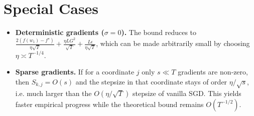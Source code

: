 \documentclass{article}
\begin{document}
\section*{Special Cases}
\begin{itemize}
    \item \textbf{Deterministic gradients ($\sigma=0$).} The bound reduces to
    $\displaystyle \frac{2(f(w_{1})-f^{\star})}{\eta\sqrt{T}}+\frac{\eta L G^{2}}{\sqrt{T}}+\frac{L\epsilon}{\eta\sqrt{T}}$,
    which can be made arbitrarily small by choosing $\eta\asymp T^{-1/4}$.
    \item \textbf{Sparse gradients.} If for a coordinate $j$ only $s\ll T$ gradients are non‑zero, then $S_{k,j}=O(s)$ and the stepsize in that coordinate stays of order $\eta/\sqrt{s}$, i.e. much larger than the $O(\eta/\sqrt{T})$ stepsize of vanilla SGD. This yields faster empirical progress while the theoretical bound remains $O(T^{-1/2})$.
\end{itemize}
\end{document}
